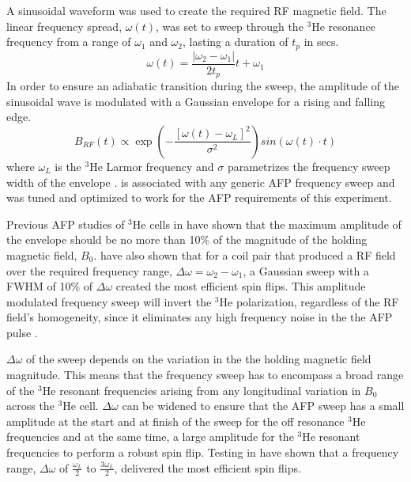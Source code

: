 A sinusoidal waveform was used to create the required RF magnetic field. The linear frequency spread, $\omega(t)$, was set to sweep through the $^3$He resonance frequency from a range of $\omega_1$ and $\omega_2$, lasting a duration of $t_p$ in secs.
\begin{equation}
    \omega(t) = \frac{\left \lvert \omega_2 - \omega_1  \right \rvert}{2t_p} t + \omega_1 
\end{equation}
In order to ensure an adiabatic transition during the sweep, the amplitude of the sinusoidal wave is modulated with a Gaussian envelope for a rising and falling edge.
\begin{equation}
    B_{RF}(t) \propto \exp\left(   -\frac{[\omega(t) - \omega_L]^2}{\sigma^2}    \right) sin(\omega(t) \cdot t)
    \label{eq:AFPrf}
\end{equation} 
where $\omega_L$ is the $^3$He Larmor frequency and $\sigma$ parametrizes the frequency sweep width of the envelope \cite{Parnell2011}.  is associated with any generic AFP frequency sweep and was tuned and optimized to work for the AFP requirements of this experiment. 

Previous AFP studies of $^3$He cells in \cite{Petoukhov2006, McKetterick2011} have shown that the maximum amplitude of the envelope should be no more than 10\% of the magnitude of the holding magnetic field, $B_0$. \cite{Petoukhov2006, McKetterick2011} have also shown that for a coil pair that produced a RF field over the required frequency range, $\Delta \omega = \omega_2 - \omega_1$, a Gaussian sweep with a FWHM of 10\% of $\Delta \omega$ created the most efficient spin flips. This amplitude modulated frequency sweep will invert the $^3$He polarization, regardless of the RF field's homogeneity, since it eliminates any high frequency noise in the the AFP pulse \cite{Garwood2001}.

$\Delta \omega$ of the sweep depends on the variation in the the holding magnetic field magnitude. This means that the frequency sweep has to encompass a broad range of the $^3$He resonant frequencies arising from any longitudinal variation in $B_0$ across the $^3$He cell. $\Delta \omega$ can be widened to ensure that the AFP sweep has a small amplitude at the start and at finish of the sweep for the off resonance $^3$He frequencies and at the same time, a large amplitude for the $^3$He resonant frequencies to perform a robust spin flip. Testing in \cite{McKetterick2011} have shown that a frequency range, $\Delta \omega$ of $\frac{\omega_L}{2}$ to $\frac{3\omega_L}{2}$, delivered the most efficient spin flips.

